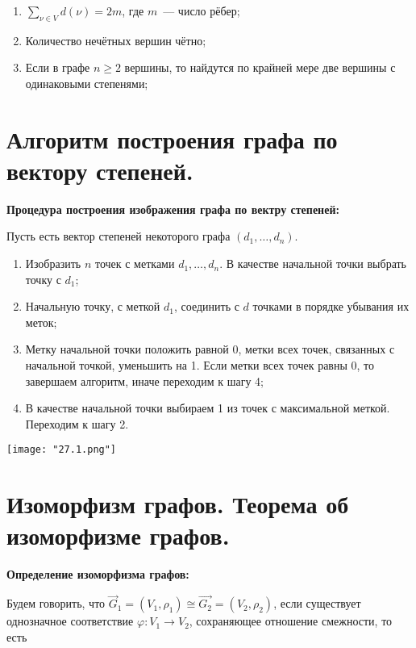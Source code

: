     \begin{enumerate}
        \item{$\sum\limits_{\nu \in V} d(\nu) = 2m$, где $m$~--- число рёбер;}
        \item{Количество нечётных вершин чётно;}
        \item{Если в графе $n \geq 2$ вершины, то найдутся по крайней мере две
        вершины с одинаковыми степенями;}
    \end{enumerate}

\section{Алгоритм построения графа по вектору степеней.}

\textbf{Процедура построения изображения графа по вектру степеней:}
    \smallskip

    Пусть есть вектор степеней некоторого графа $(d_1, \dots, d_n)$.

    \begin{enumerate}
        \item{Изобразить $n$ точек с метками $d_1, \dots, d_n$. В качестве
        начальной точки выбрать точку с $d_1$;}
        \item{Начальную точку, с меткой $d_1$, соединить с $d$ точками в порядке
        убывания их меток;}
        \item{Метку начальной точки положить равной $0$, метки всех точек,
        связанных с начальной точкой, уменьшить на 1. Если метки всех точек
        равны 0, то завершаем алгоритм, иначе переходим к шагу 4;}
        \item{В качестве начальной точки выбираем 1 из точек с максимальной меткой.
        Переходим к шагу 2.}
    \end{enumerate}
    \bigskip

    \begin{center}
        \texttt{[image: "27.1.png"]}
    \end{center}

\section{Изоморфизм графов. Теорема об изоморфизме графов.}

\textbf{Определение изоморфизма графов:}
    \smallskip

    Будем говорить, что $\overrightarrow{G}_1 = (V_1, \rho_1) \cong 
    \overrightarrow{G_2} = (V_2, \rho_2)$, если существует однозначное
    соответствие $\varphi: V_1 \to V_2$, сохраняющее отношение смежности,
    то есть 
    
